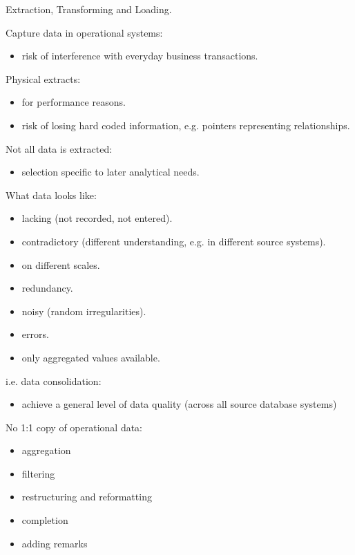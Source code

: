 \begin{breakbox}
\newline \textcolor{Emerald}{E}xtraction, \textcolor{Emerald}{T}ransforming and \textcolor{Emerald}{L}oading.
\end{breakbox}

\begin{breakbox}
\newline Capture data in operational systems:
\begin{itemize}
	\item risk of interference with everyday business transactions.
\end{itemize}
Physical extracts:
\begin{itemize}
	\item for performance reasons.
	\item risk of losing hard coded information, e.g. pointers representing relationships.
\end{itemize}
Not all data is extracted:
\begin{itemize}
	\item selection specific to later analytical needs.
\end{itemize}
What data looks like:
\begin{itemize}
	\item lacking (not recorded, not entered).
	\item contradictory (different understanding, e.g.
in different source systems).
	\item on different scales.
	\item redundancy.
	\item noisy (random irregularities).
	\item errors.
	\item only aggregated values available.
\end{itemize}
\end{breakbox}

\begin{breakbox}
\newline i.e. data consolidation:
\begin{itemize}
	\item achieve a general level of data quality (across all source database systems)
\end{itemize}
No 1:1 copy of operational data:
\begin{itemize}
	\item aggregation
	\item filtering
	\item restructuring and reformatting
	\item completion
	\item adding remarks
\end{itemize}
\end{breakbox}

